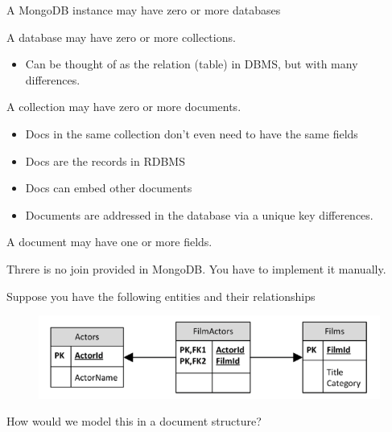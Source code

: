\documentclass{beamer}
\begin{document}
\begin{slide}{
\item A MongoDB instance may have zero or more databases
\item A database may have zero or more collections.
\begin{itemize}
	\item Can be thought of as the relation (table) in DBMS, but with many differences.
\end{itemize}
\item A collection may have zero or more documents.
\begin{itemize}
	\item Docs in the same collection don’t even need to have the same
fields
	\item Docs are the records in RDBMS
	\item Docs can embed other documents
	\item Documents are addressed in the database via a unique key differences.
\end{itemize}
\item A document may have one or more fields.
\item Threre is no join provided in MongoDB. You have to implement it manually.
}\end{slide}



\begin{slide}{
\item Suppose you have the following entities and their relationships
\begin{figure}
		\includegraphics[scale=0.3]{img/mongo-relational}
\end{figure}
\item How would we model this in a document structure?
}\end{slide}
\end{document}
